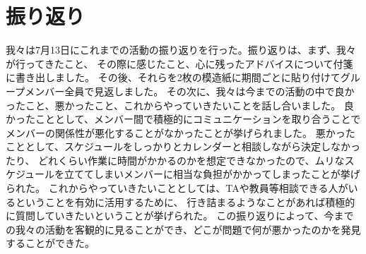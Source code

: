 \chapter{振り返り}
我々は7月13日にこれまでの活動の振り返りを行った。振り返りは、まず、我々が行ってきたこと、
その際に感じたこと、心に残ったアドバイスについて付箋に書き出しました。
その後、それらを2枚の模造紙に期間ごとに貼り付けてグループメンバー全員で見返しました。
その次に、我々は今までの活動の中で良かったこと、悪かったこと、これからやっていきたいことを話し合いました。
良かったこととして、メンバー間で積極的にコミュニケーションを取り合うことでメンバーの関係性が悪化することがなかったことが挙げられました。
悪かったこととして、スケジュールをしっかりとカレンダーと相談しながら決定しなかったり、
どれくらい作業に時間がかかるのかを想定できなかったので、ムリなスケジュールを立ててしまいメンバーに相当な負担がかかってしまったことが挙げられた。
これからやっていきたいこととしては、TAや教員等相談できる人がいるということを有効に活用するために、
行き詰まるようなことがあれば積極的に質問していきたいということが挙げられた。
この振り返りによって、今までの我々の活動を客観的に見ることができ、どこが問題で何が悪かったのかを発見することができた。
